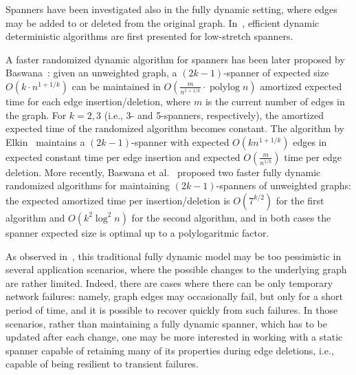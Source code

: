 \documentclass{article}
\DeclareMathOperator*{\polylog}{polylog}
\newcommand{\nota}[1]{\textbf{(*)}\marginpar {\tiny \raggedright{(*) #1}}}
\newcommand{\commento}[1] {}
\begin{document}
Spanners have been investigated also in the fully dynamic setting, where edges may be added to or deleted
from the original graph. In~\cite{AFI06}, efficient dynamic deterministic algorithms are first presented for low-stretch spanners.
\commento{
\nota{PGF: attenzione, da qui in poi parliamo di termini additivi, quindi unweighted.}
a (2,1)-spanner and a (3,2)-spanner of an unweighted
graph are maintained under an intermixed sequence of $\Omega(n)$
edge insertions and deletions in $O(\Delta)$ amortized time per
operation, where $\Delta$ is the maximum vertex degree of the original
graph. The (2,1)-spanner has $O(n^{3/2})$ edges, while the
(3,2)-spanner has $O(n^{4/3})$ edges. 
}
A faster randomized dynamic
algorithm for spanners has been later proposed by
Baswana~\cite{ESA06}: given an unweighted graph, a
$(2k-1)$-spanner of expected size $O(k\cdot n^{1+1/k})$ can be maintained in
$O(\frac{m}{n^{1+1/k}} \cdot \polylog n)$ amortized expected time for
each edge insertion/deletion, where $m$ is the current number of edges in the graph.
For $k=2,3$ (i.e., 3- and
5-spanners, respectively), the amortized expected time of the randomized
algorithm becomes constant. The algorithm by Elkin~\cite{Elkin07} maintains a $(2k-1)$-spanner with expected
$O(k n^{1+1/k})$ edges in expected constant  time per edge insertion
and expected $O(\frac{m}{n^{1/k}})$ time per edge deletion. 
More recently, Baswana et al.~\cite{baswanaACM} proposed two faster fully dynamic randomized algorithms for maintaining $(2k-1)$-spanners of unweighted graphs: the expected amortized time  per insertion/deletion is $O(7^{k/2})$ for the first algorithm and $O(k^2 \log^2 n)$ for the second algorithm, and in both cases  the spanner expected size is optimal up to a polylogaritmic factor.

As observed in~\cite{STOC09}, this traditional fully dynamic model may be too pessimistic in several application scenarios,
where the possible changes to the underlying graph are rather
limited. Indeed, there are cases where there can be only temporary network failures: namely, graph edges may occasionally fail, but only for a short period of time, and it is possible to recover quickly 
from such failures. In those scenarios, rather than maintaining a fully dynamic spanner, which has to be updated after each change, one may be more interested in working with a static spanner capable of retaining many of its properties during edge deletions, i.e., capable of being resilient to transient failures.
\end{document}
